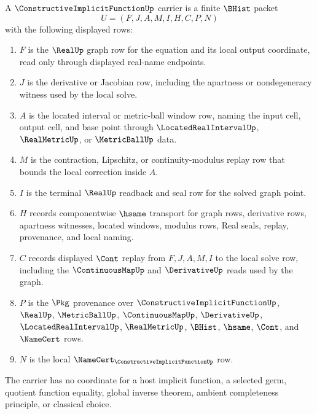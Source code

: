 \begin{definition}
\label{def:constructive-implicit-function-carrier}
A $\ConstructiveImplicitFunctionUp$ carrier is a finite $\BHist$ packet
$$
U=(F,J,A,M,I,H,C,P,N)
$$
with the following displayed rows:
\begin{enumerate}
\item $F$ is the $\RealUp$ graph row for the equation and its local output coordinate, read only through displayed real-name endpoints.
\item $J$ is the derivative or Jacobian row, including the apartness or nondegeneracy witness used by the local solve.
\item $A$ is the located interval or metric-ball window row, naming the input cell, output cell, and base point through $\LocatedRealIntervalUp$, $\RealMetricUp$, or $\MetricBallUp$ data.
\item $M$ is the contraction, Lipschitz, or continuity-modulus replay row that bounds the local correction inside $A$.
\item $I$ is the terminal $\RealUp$ readback and seal row for the solved graph point.
\item $H$ records componentwise $\hsame$ transport for graph rows, derivative rows, apartness witnesses, located windows, modulus rows, Real seals, replay, provenance, and local naming.
\item $C$ records displayed $\Cont$ replay from $F,J,A,M,I$ to the local solve row, including the $\ContinuousMapUp$ and $\DerivativeUp$ reads used by the graph.
\item $P$ is the $\Pkg$ provenance over $\ConstructiveImplicitFunctionUp$, $\RealUp$, $\MetricBallUp$, $\ContinuousMapUp$, $\DerivativeUp$, $\LocatedRealIntervalUp$, $\RealMetricUp$, $\BHist$, $\hsame$, $\Cont$, and $\NameCert$ rows.
\item $N$ is the local $\NameCert_{\ConstructiveImplicitFunctionUp}$ row.
\end{enumerate}
The carrier has no coordinate for a host implicit function, a selected germ, quotient function equality, global inverse theorem, ambient completeness principle, or classical choice.
\end{definition}

